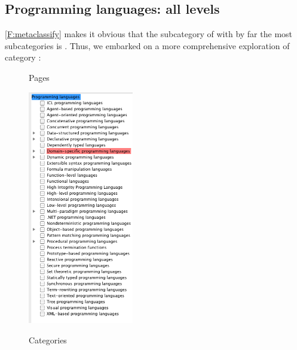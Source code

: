 
\subsection{Programming languages: all levels}

\autoref{F:metaclassify} makes it obvious that the subcategory of  with by far the most subcategories is 
. Thus, we embarked on a more comprehensive exploration of category :


\begin{figure}[t!]
\parbox{.48\textwidth}{
Pages

\noindent 
\includegraphics[width=0.41\textwidth]{figures/plPagesTransitive.png}
}\hfill\parbox{.48\textwidth}{

Categories 

}
\end{figure}
